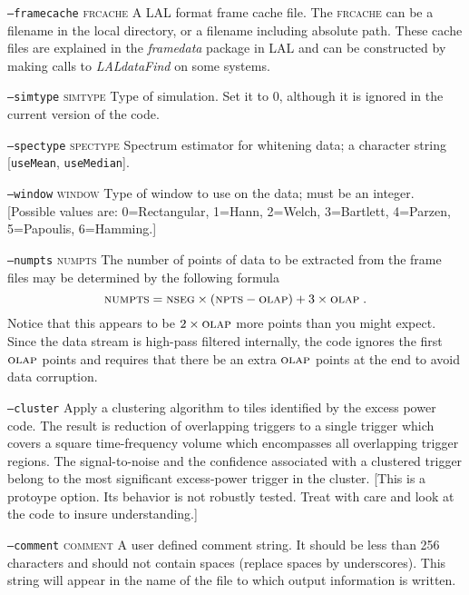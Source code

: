 \begin{entry}
\begin{entry}
\item[\texttt{--framecache} \textsc{frcache}] A LAL format frame
cache file.    The \textsc{frcache} can be a filename in the local
directory,  or a filename including absolute path.   These cache files
are explained in the \emph{framedata} package in LAL and can be
constructed by making calls to \emph{LALdataFind} on some systems.

\item[\texttt{--simtype} \textsc{simtype}] Type of simulation. Set it to 0,
although it is ignored in the current version of the code.

\item[\texttt{--spectype} \textsc{spectype}] Spectrum estimator for whitening
data;  a character string [\texttt{useMean}, \texttt{useMedian}].

\item[\texttt{--window} \textsc{window}] Type of window to use on the data;
must be an integer.  [Possible values are:  0=Rectangular, 1=Hann,
2=Welch, 3=Bartlett, 4=Parzen, 5=Papoulis, 6=Hamming.]

\item[\texttt{--numpts} \textsc{numpts}] The number of points of data
to be extracted from the frame files may be determined by the
following formula
\[
\mbox{\textsc{numpts}} = \mbox{\textsc{nseg}} \times (
\mbox{\textsc{npts}} - 
\mbox{\textsc{olap}} ) + 3 \times
\mbox{\textsc{olap}} \; .
\]
Notice that this appears to be $2 \times \textsc{olap}$ more points
than you might expect.   Since the data stream is high-pass filtered
internally,   the code ignores the first $\textsc{olap}$ points and
requires that there be an extra $\textsc{olap}$ points at the end to
avoid data corruption.

\item[\texttt{--cluster}] Apply a clustering algorithm to tiles
identified by the excess power code.  The result is reduction of
overlapping triggers to a single trigger which covers a square
time-frequency volume which encompasses all overlapping trigger
regions.   The signal-to-noise and the confidence associated with a
clustered trigger belong to the most significant excess-power trigger
in the cluster.  [This is a protoype option.  Its behavior is not
robustly tested.  Treat with care and look at the code to insure
understanding.]

\item[\texttt{--comment} \textsc{comment}] A user defined comment
string.  It should be less than 256 characters and should not contain
spaces (replace spaces by underscores).  This string will appear in
the name of the file to which output information is written.


\end{entry}
\end{entry}
